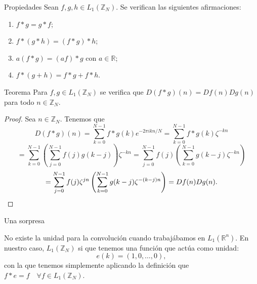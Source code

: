 \documentclass[11pt,compress]{beamer}
\newcommand\R{\mathbb{R}}
\newcommand\Z{\mathbb{Z}}
\begin{document}
\begin{frame}
\begin{block}{Propiedades}
Sean $f,g,h \in L_1(\Z_N)$. Se verifican las siguientes afirmaciones:
\begin{enumerate}[<+-|alert@+>]
    \item $f\ast g=g\ast f$;
    \item $f\ast (g\ast h)=(f\ast g)\ast h$;
    \item $a(f\ast g)=(af)\ast g$ con $a \in \R$;
    \item $f\ast(g+h)=f\ast g+f\ast h$.
\end{enumerate}
\end{block}

\end{frame}

\begin{frame}
\begin{alertblock}{Teorema}
 Para $f,g \in L_1(\Z_N)$ se verifica que $D(f \ast g)(n)=Df(n)Dg(n)$ para todo $n \in \Z_N$.
\end{alertblock}

\end{frame}
\begin{frame}
\begin{proof}%
 Sea $n \in \Z_N$. Tenemos que
\[
    D(f\ast g)(n) = \sum_{k=0}^{N-1}f \ast g(k)e^{-2\pi ikn/N}
    =\sum_{k=0}^{N-1} f \ast g(k)\zeta^{-kn}
\]
\[=\sum_{k=0}^{N-1} \left(\sum_{j=0}^{N-1} f(j)g(k-j)\right)\zeta^{-kn}
    =\sum_{j=0}^{N-1}f(j)\left(\sum_{k=0}^{N-1}g(k-j)\zeta^{-kn}\right)
\]
\[=\sum_{j=0}^{N-1} f(j)\zeta^{jn}\left(\sum_{k=0}^{N-1}g(k-j)\zeta^{-(k-j)n}\right)
    =Df(n)Dg(n). \qedhere
 \]
\end{proof}
	\begin{center}
		\begin{Large}
		\end{Large}
	\end{center}
\end{frame}

\begin{frame}{Una sorpresa}

No existe la unidad para la convolución cuando trabajábamos en $L_1(\R^n)$. En nuestro caso, $L_1(\Z_N)$ si que tenemos una función que actúa como unidad:
\[
e(k)=(1,0,\dots,0),
\]
con la que tenemos simplemente aplicando la definición que $f \ast e=f \quad \forall f \in L_1(\Z_N)$.


\end{frame}
\end{document}
